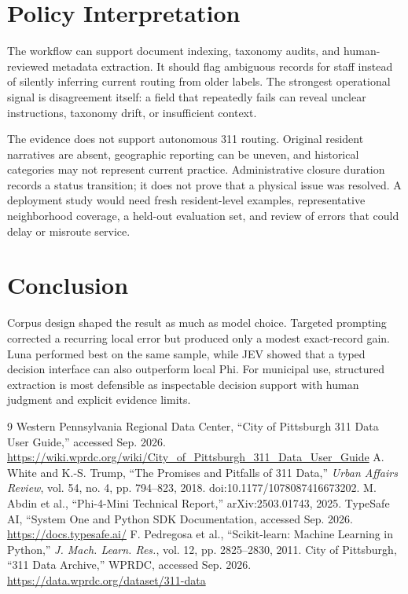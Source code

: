 \documentclass[9pt]{article}
\begin{document}
\begin{minipage}[t]{0.485\textwidth}
\vspace{0pt}
\section{Policy Interpretation}
The workflow can support document indexing, taxonomy audits, and human-reviewed metadata extraction. It should flag ambiguous records for staff instead of silently inferring current routing from older labels. The strongest operational signal is disagreement itself: a field that repeatedly fails can reveal unclear instructions, taxonomy drift, or insufficient context.

The evidence does not support autonomous 311 routing. Original resident narratives are absent, geographic reporting can be uneven, and historical categories may not represent current practice. Administrative closure duration records a status transition; it does not prove that a physical issue was resolved. A deployment study would need fresh resident-level examples, representative neighborhood coverage, a held-out evaluation set, and review of errors that could delay or misroute service.

\section{Conclusion}
Corpus design shaped the result as much as model choice. Targeted prompting corrected a recurring local error but produced only a modest exact-record gain. Luna performed best on the same sample, while JEV showed that a typed decision interface can also outperform local Phi. For municipal use, structured extraction is most defensible as inspectable decision support with human judgment and explicit evidence limits.

\begin{thebibliography}{9}\footnotesize
\setlength{\itemsep}{1pt}
 Western Pennsylvania Regional Data Center, ``City of Pittsburgh 311 Data User Guide,'' accessed Sep. 2026. \url{https://wiki.wprdc.org/wiki/City_of_Pittsburgh_311_Data_User_Guide}
 A. White and K.-S. Trump, ``The Promises and Pitfalls of 311 Data,'' \emph{Urban Affairs Review}, vol. 54, no. 4, pp. 794--823, 2018. doi:10.1177/1078087416673202.
 M. Abdin et al., ``Phi-4-Mini Technical Report,'' arXiv:2503.01743, 2025.
 TypeSafe AI, ``System One and Python SDK Documentation, accessed Sep. 2026. \url{https://docs.typesafe.ai/}
 F. Pedregosa et al., ``Scikit-learn: Machine Learning in Python,'' \emph{J. Mach. Learn. Res.}, vol. 12, pp. 2825--2830, 2011.
 City of Pittsburgh, ``311 Data Archive,'' WPRDC, accessed Sep. 2026. \url{https://data.wprdc.org/dataset/311-data}
\end{thebibliography}
\end{minipage}
\end{document}
